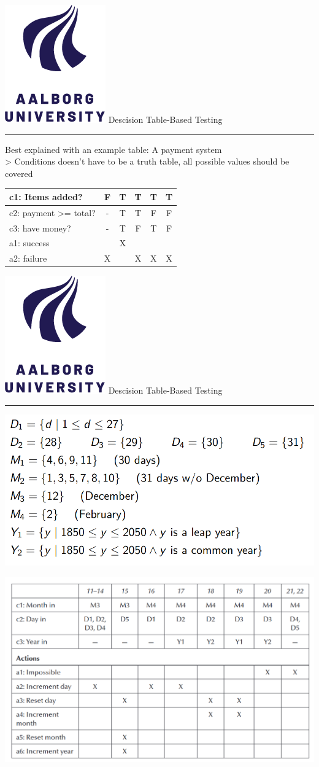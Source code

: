 \documentclass[aspectratio=1610,17pt,utf8]{beamer}
\newcommand{\regularframe}[1]{\color{black}\includegraphics[width=.05\textwidth]{figures/aau.png} #1\\\hrule}
\newcommand{\rf}[1]{\regularframe{#1}}
\begin{document}
\begin{frame}{\rf{Descision Table-Based Testing}}
    Best explained with an example table: A payment system\\
    > Conditions doesn't have to be a truth table, all possible values should be covered
    \begin{table}
        \begin{tabular}{|l|c|c|c|c|c|}\hline
            c1: Items added?      & F & T & T & T & T \\\hline
            c2: payment >= total? & - & T & T & F & F \\\hline
            c3: have money?       & - & T & F & T & F \\\hline\hline
            a1: success           &   & X &   &   &   \\\hline
            a2: failure           & X &   & X & X & X \\\hline
        \end{tabular}
    \end{table}
\end{frame}

\begin{frame}{\rf{Descision Table-Based Testing}}
    \begin{minipage}{.49\textwidth}
        \includegraphics[width=\textwidth]{figures/descision_table_1.png}
    \end{minipage}
    \begin{minipage}{.49\textwidth}
        \includegraphics[width=\textwidth]{figures/descision_table_2.png}
    \end{minipage}
\end{frame}
\end{document}
